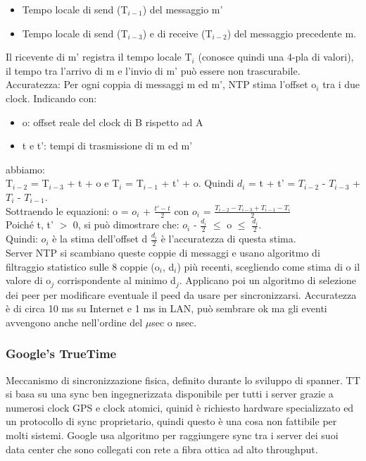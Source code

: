 \documentclass[16px]{article}
\begin{document}
\begin{itemize}
\item Tempo locale di send (T$_{i-1}$) del messaggio m'
\item Tempo locale di send (T$_{i-3}$) e di receive (T$_{i-2}$) del messaggio precedente m.
\end{itemize}
Il ricevente di m' registra il tempo locale T$_i$ (conosce quindi una 4-pla di valori), il tempo tra l'arrivo di m e l'invio di m' può essere non trascurabile.\\ Accuratezza: Per ogni coppia di messaggi m ed m', NTP stima l'offset o$_i$ tra i due clock. Indicando con:
\begin{itemize}
\item o: offset reale del clock di B rispetto ad A
\item t e t': tempi di trasmissione di m ed m'
\end{itemize} 
abbiamo:\\ 
T$_{i-2}$ =  T$_{i-3}$ + t + o e T$_i$ = T$_{i-1}$ + t' + o. Quindi $d_i$ = t + t' = $T_{i-2}$ - $T_{i-3}$ + $T_i$ - $T_{i-1}$.\\ Sottraendo le equazioni: o = $o_i$ + $\frac{t'-t}{2}$ con $o_i$ = $\frac{T_{i-2} - T_{i-3} + T_{i-1} - T_i}{2}$\\ Poiché t, t' $>$ 0, si può dimostrare che: $o_i$ - $\frac{d_i}{2}$ $\leq$ o $\leq$ $\frac{d_i}{2}$.\\ Quindi: $o_i$ è la stima dell'offset d $\frac{d_i}{2}$ è l'accuratezza di questa stima.\\ Server NTP si scambiano queste coppie di messaggi e usano algoritmo di filtraggio statistico sulle 8 coppie (o$_i$, d$_i$) più recenti, scegliendo come stima di o il valore di o$_j$ corrispondente al minimo d$_j$. Applicano poi un algoritmo di selezione dei peer per modificare eventuale il peed da usare per sincronizzarsi. Accuratezza è di circa 10 ms su Internet e 1 ms in LAN, può sembrare ok ma gli eventi avvengono anche nell'ordine del $\mu$sec o nsec.
\subsubsection{Google's TrueTime}
Meccanismo di sincronizzazione fisica, definito durante lo sviluppo di spanner. TT si basa su una sync ben ingegnerizzata disponibile per tutti i server grazie a numerosi clock GPS e clock atomici, quinid è richiesto hardware specializzato ed un protocollo di sync proprietario, quindi questo è una cosa non fattibile per molti sistemi. Google usa algoritmo per raggiungere sync tra i server dei suoi data center che sono collegati con rete a fibra ottica ad alto throughput.
\end{document}
